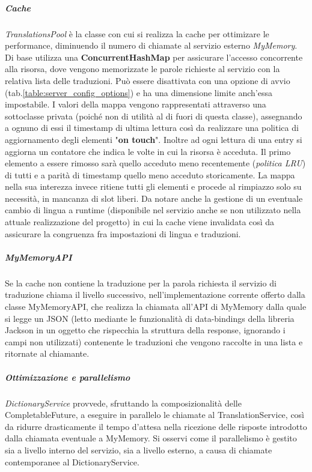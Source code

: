 \documentclass{article}
\begin{document}
    \subparagraph{Cache} \textit{TranslationsPool} è la classe con cui si realizza la cache per ottimizare le performance, diminuendo il numero di chiamate al servizio esterno \emph{MyMemory}. Di base utilizza una \textbf{ConcurrentHashMap} per assicurare l'accesso concorrente alla risorsa, dove vengono memorizzate le parole richieste al servizio con la relativa lista delle traduzioni. Può essere disattivata con una opzione di avvio (tab.\ref{table:server_config_options}) e ha una dimensione limite anch'essa impostabile. I valori della mappa vengono rappresentati attraverso una sottoclasse privata (poiché non di utilità al di fuori di questa classe), assegnando a ognuno di essi il timestamp di ultima lettura così da realizzare una politica di aggiornamento degli elementi "\textbf{on touch}". Inoltre ad ogni lettura di una entry si aggiorna un contatore che indica le volte in cui la risorsa è acceduta. Il primo elemento a essere rimosso sarà quello acceduto meno recentemente (\textit{politica LRU}) di tutti e a parità di timestamp quello meno acceduto storicamente. La mappa nella sua interezza invece ritiene tutti gli elementi e procede al rimpiazzo solo su necessità, in mancanza di slot liberi. Da notare anche la gestione di un eventuale cambio di lingua a runtime (disponibile nel servizio anche se non utilizzato nella attuale realizzazione del progetto) in cui la cache viene invalidata così da assicurare la congruenza fra impostazioni di lingua e traduzioni.

    \subparagraph{MyMemoryAPI} Se la cache non contiene la traduzione per la parola richiesta il servizio di traduzione chiama il livello successivo, nell'implementazione corrente offerto dalla classe MyMemoryAPI, che realizza la chiamata all'API di MyMemory dalla quale si legge un JSON (letto mediante le funzionalità di data-bindings della libreria Jackson in un oggetto che rispecchia la struttura della response, ignorando i campi non utilizzati) contenente le traduzioni che vengono raccolte in una lista e ritornate al chiamante.

    \subparagraph{Ottimizzazione e parallelismo} \emph{DictionaryService} provvede, sfruttando la composizionalità delle CompletableFuture, a eseguire in parallelo le chiamate al TranslationService, così da ridurre drasticamente il tempo d'attesa nella ricezione delle risposte introdotto dalla chiamata eventuale a MyMemory. Si osservi come il parallelismo è gestito sia a livello interno del servizio, sia a livello esterno, a causa di chiamate contemporanee al DictionaryService.
\end{document}
